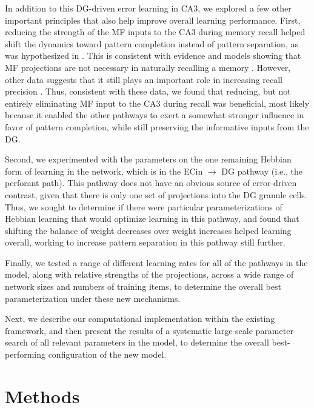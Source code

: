 \documentclass[11pt,twoside]{article}
\newif\myifpdf
\begin{document}
In addition to this DG-driven error learning in CA3, we explored a few other important principles that also help improve overall learning performance.  First, reducing the strength of the MF inputs to the CA3 during memory recall helped shift the dynamics toward pattern completion instead of pattern separation, as was hypothesized in \citet{OReillyMcClelland94}.  This is consistent with evidence and models showing that MF projections are not necessary in naturally recalling a memory \citep{NakashibaCushmanPelkeyEtAl12,BernierLacagninaAyoubEtAl17,Rolls13}.  However, other data suggests that it still plays an important role in increasing recall precision \citep{RuedigerVittoriBednarekEtAl11,NakashibaCushmanPelkeyEtAl12,BernierLacagninaAyoubEtAl17,PignatelliRyanRoyEtAl19}. Thus, consistent with these data, we found that reducing, but not entirely eliminating MF input to the CA3 during recall was beneficial, most likely because it enabled the other pathways to exert a somewhat stronger influence in favor of pattern completion, while still preserving the informative inputs from the DG.

Second, we experimented with the parameters on the one remaining Hebbian form of learning in the network, which is in the ECin $\rightarrow$ DG pathway (i.e., the perforant path).  This pathway does not have an obvious source of error-driven contrast, given that there is only one set of projections into the DG granule cells.  Thus, we sought to determine if there were particular parameterizations of Hebbian learning that would optimize learning in this pathway, and found that shifting the balance of weight decreases over weight increases helped learning overall, working to increase pattern separation in this pathway still further.

Finally, we tested a range of different learning rates for all of the pathways in the model, along with relative strengths of the projections, across a wide range of network sizes and numbers of training items, to determine the overall best parameterization under these new mechanisms.

Next, we describe our computational implementation within the existing \citet{KetzMorkondaOReilly13} framework, and then present the results of a systematic large-scale parameter search of all relevant parameters in the model, to determine the overall best-performing configuration of the new model. 

\section{Methods}
\end{document}
